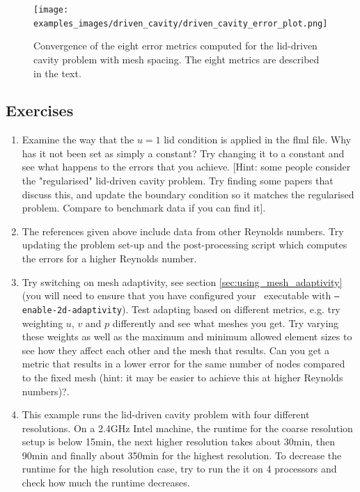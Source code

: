 \begin{figure}
\centering
\texttt{[image: examples\_images/driven\_cavity/driven\_cavity\_error\_plot.png]}
\caption{Convergence of the eight error metrics computed for the lid-driven cavity problem with mesh spacing. The eight
metrics are described in the text.}
\label{fig:driven_cavity2}
\end{figure}

\subsection{Exercises}
\begin{enumerate}
\item Examine the way that the $u=1$ lid condition is applied in the flml file. Why has it not been set as simply a constant?
Try changing it to a constant and see what happens to the errors that you achieve. [Hint: some people consider the "regularised" 
lid-driven cavity problem. Try finding some papers that discuss this, and update the boundary condition so it matches the 
regularised problem. Compare to benchmark data if you can find it].
\item The references given above include data from other Reynolds numbers. Try updating the problem set-up and the post-processing script which computes
the errors for a higher Reynolds number.
\item Try switching on mesh adaptivity, see section \ref{sec:using_mesh_adaptivity} (you will need to ensure that you have configured your \fluidity\ executable with \texttt{--enable-2d-adaptivity}). 
Test adapting based on different metrics, e.g. try weighting $u$, $v$ and $p$
differently and see what meshes you get. Try varying these weights as well as the maximum and minimum allowed element
sizes to see how they affect each other and the mesh that results. Can you get a metric that results in a lower
error for the same number of nodes compared to the fixed mesh (hint: it may be easier to achieve this at higher Reynolds numbers)?.
\item This example runs the lid-driven cavity problem with four different resolutions. On a 2.4GHz Intel machine, the runtime for the coarse resolution setup is below 15min, the next higher resolution takes about 30min, then 90min and finally about 350min for the highest resolution. To decrease the runtime for the high resolution case, try to run the it on 4 processors and check how much the runtime decreases.
\end{enumerate}


